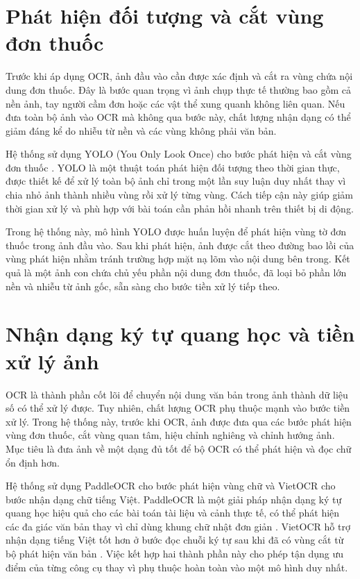 \documentclass[12pt,a4paper]{report}
\begin{document}
\section{Phát hiện đối tượng và cắt vùng đơn thuốc}

Trước khi áp dụng OCR, ảnh đầu vào cần được xác định và cắt ra vùng chứa nội dung đơn thuốc. Đây là bước quan trọng vì ảnh chụp thực tế thường bao gồm cả nền ảnh, tay người cầm đơn hoặc các vật thể xung quanh không liên quan. Nếu đưa toàn bộ ảnh vào OCR mà không qua bước này, chất lượng nhận dạng có thể giảm đáng kể do nhiễu từ nền và các vùng không phải văn bản.

Hệ thống sử dụng YOLO (You Only Look Once) cho bước phát hiện và cắt vùng đơn thuốc \cite{yolo}. YOLO là một thuật toán phát hiện đối tượng theo thời gian thực, được thiết kế để xử lý toàn bộ ảnh chỉ trong một lần suy luận duy nhất thay vì chia nhỏ ảnh thành nhiều vùng rồi xử lý từng vùng. Cách tiếp cận này giúp giảm thời gian xử lý và phù hợp với bài toán cần phản hồi nhanh trên thiết bị di động.

Trong hệ thống này, mô hình YOLO được huấn luyện để phát hiện vùng tờ đơn thuốc trong ảnh đầu vào. Sau khi phát hiện, ảnh được cắt theo đường bao lồi của vùng phát hiện nhằm tránh trường hợp mặt nạ lõm vào nội dung bên trong. Kết quả là một ảnh con chứa chủ yếu phần nội dung đơn thuốc, đã loại bỏ phần lớn nền và nhiễu từ ảnh gốc, sẵn sàng cho bước tiền xử lý tiếp theo.

\section{Nhận dạng ký tự quang học và tiền xử lý ảnh}

OCR là thành phần cốt lõi để chuyển nội dung văn bản trong ảnh thành dữ liệu số có thể xử lý được. Tuy nhiên, chất lượng OCR phụ thuộc mạnh vào bước tiền xử lý. Trong hệ thống này, trước khi OCR, ảnh được đưa qua các bước phát hiện vùng đơn thuốc, cắt vùng quan tâm, hiệu chỉnh nghiêng và chỉnh hướng ảnh. Mục tiêu là đưa ảnh về một dạng đủ tốt để bộ OCR có thể phát hiện và đọc chữ ổn định hơn.

Hệ thống sử dụng PaddleOCR cho bước phát hiện vùng chữ và VietOCR cho bước nhận dạng chữ tiếng Việt. PaddleOCR là một giải pháp nhận dạng ký tự quang học hiệu quả cho các bài toán tài liệu và cảnh thực tế, có thể phát hiện các đa giác văn bản thay vì chỉ dùng khung chữ nhật đơn giản \cite{paddleocr}. VietOCR hỗ trợ nhận dạng tiếng Việt tốt hơn ở bước đọc chuỗi ký tự sau khi đã có vùng cắt từ bộ phát hiện văn bản \cite{vietocr}. Việc kết hợp hai thành phần này cho phép tận dụng ưu điểm của từng công cụ thay vì phụ thuộc hoàn toàn vào một mô hình duy nhất.
\end{document}
